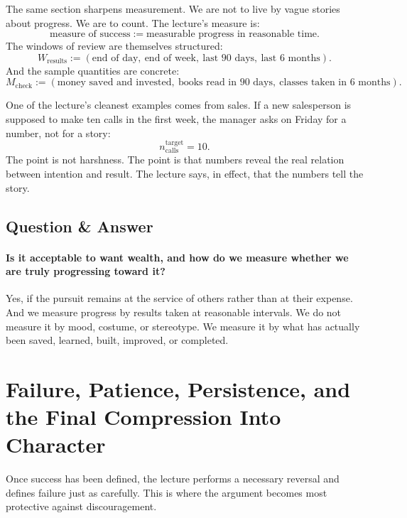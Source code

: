 The same section sharpens measurement. We are not to live by vague stories about progress. We are to count. The lecture's measure is:
\begin{equation}
\text{measure of success} := \text{measurable progress in reasonable time}.
\end{equation}
The windows of review are themselves structured:
\begin{equation}
W_{\text{results}} := (\text{end of day},\ \text{end of week},\ \text{last 90 days},\ \text{last 6 months}).
\end{equation}
And the sample quantities are concrete:
\begin{equation}
M_{\text{check}} := (\text{money saved and invested},\ \text{books read in 90 days},\ \text{classes taken in 6 months}).
\end{equation}

One of the lecture's cleanest examples comes from sales. If a new salesperson is supposed to make ten calls in the first week, the manager asks on Friday for a number, not for a story:
\begin{equation}
n_{\text{calls}}^{\text{target}} = 10.
\end{equation}
The point is not harshness. The point is that numbers reveal the real relation between intention and result. The lecture says, in effect, that the numbers tell the story.

\subsection{Question \& Answer}

\paragraph{Is it acceptable to want wealth, and how do we measure whether we are truly progressing toward it?}
Yes, if the pursuit remains at the service of others rather than at their expense. And we measure progress by results taken at reasonable intervals. We do not measure it by mood, costume, or stereotype. We measure it by what has actually been saved, learned, built, improved, or completed.

\section{Failure, Patience, Persistence, and the Final Compression Into Character}

Once success has been defined, the lecture performs a necessary reversal and defines failure just as carefully. This is where the argument becomes most protective against discouragement.

